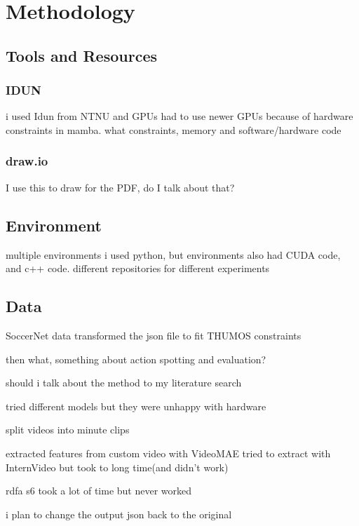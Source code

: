 \chapter{Methodology} 
\label{chap:methodology}

\section{Tools and Resources}

\subsection{IDUN}
i used Idun from NTNU and GPUs
had to use newer GPUs because of hardware constraints in mamba. what constraints, memory and software/hardware code

\subsection{draw.io}
I use this to draw for the PDF, do I talk about that?

\section{Environment}
multiple environments
i used python, but environments also had CUDA code, and c++ code. 
different repositories for different experiments

\section{Data}
SoccerNet data
transformed the json file to fit THUMOS constraints

then what, something about action spotting and evaluation?

should i talk about the method to my literature search

tried different models but they were unhappy with hardware

split videos into minute clips

extracted features from custom video with VideoMAE
tried to extract with InternVideo but took to long time(and didn't work)

rdfa s6 took a lot of time but never worked

i plan to change the output json back to the original